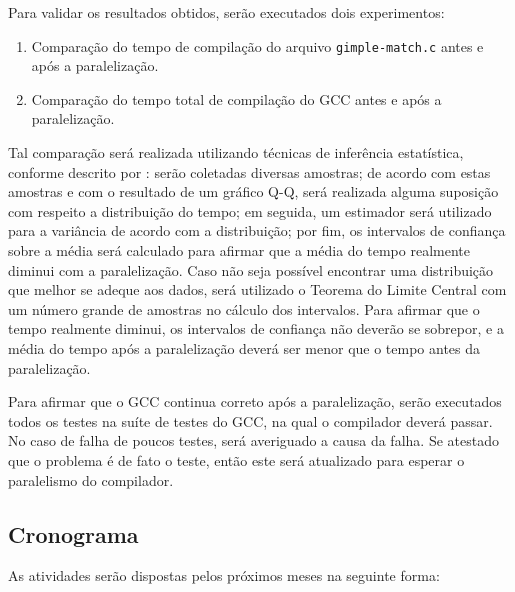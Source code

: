 Para validar os resultados obtidos, serão executados dois experimentos:
\begin{enumerate}
    \item Comparação do tempo de compilação do arquivo \texttt{gimple-match.c}
        antes e após a paralelização.


    \item Comparação do tempo total de compilação do GCC antes e após a paralelização.
\end{enumerate}
Tal comparação será realizada utilizando
técnicas de inferência estatística, conforme descrito por
\cite{morettin2017estatistica}: serão
coletadas diversas amostras; de acordo com estas amostras e com o resultado de um gráfico Q-Q, será realizada alguma suposição com respeito a distribuição
do tempo; em seguida, um estimador será utilizado para a variância
de acordo com a distribuição; por fim, os intervalos de confiança sobre a média será calculado
para afirmar que a média do tempo realmente diminui com a paralelização. Caso não
seja possível encontrar uma distribuição que melhor se adeque aos dados, será utilizado
o Teorema do Limite Central com um número grande de amostras no cálculo dos intervalos.
Para afirmar que o tempo realmente diminui, os intervalos de confiança não deverão
se sobrepor, e a média do tempo após a paralelização deverá ser menor que o tempo
antes da paralelização.

Para afirmar que o GCC continua correto após a paralelização, serão executados
todos os testes na suíte de testes do GCC, na qual o compilador deverá passar.
No caso de falha de poucos testes, será averiguado a causa da falha. Se atestado
que o problema é de fato o teste, então este será atualizado para
esperar o paralelismo do compilador.

\subsection{Cronograma}

As atividades serão dispostas pelos próximos meses na seguinte forma:

